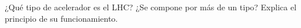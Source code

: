 \documentclass[./../main.tex]{subfiles}
\begin{document}
    \begin{exercise}
        ¿Qué tipo de acelerador es el LHC? ¿Se compone por más de un tipo? Explica el principio de su funcionamiento.
    \end{exercise}
\end{document}
